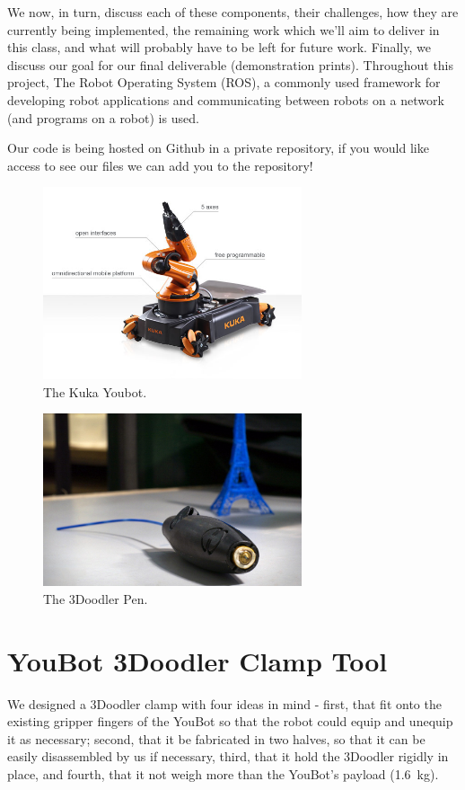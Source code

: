 \documentclass[conference]{acmsiggraph}
\begin{document}
We now, in turn, discuss each of these components, their challenges, how they are currently being implemented, the remaining work which we'll aim to deliver in this class, and what will probably have to be left for future work.  Finally, we discuss our goal for our final deliverable (demonstration prints).  Throughout this project, The Robot Operating System (ROS), a commonly used framework for developing robot applications and communicating between robots on a network (and programs on a robot) is used.

Our code is being hosted on Github in a private repository, if you would like access to see our files we can add you to the repository!

\begin{figure}[ht]
  \centering
  \includegraphics[width=3.0in]{images/youbot.jpg}
  \caption{The Kuka Youbot.}
  \label{fig:youbot}
\end{figure}

\begin{figure}[ht]
  \centering
  \includegraphics[width=3.0in]{images/3doodler.jpg}
  \caption{The 3Doodler Pen.}
  \label{fig:3doodler}
\end{figure}



\section{YouBot 3Doodler Clamp Tool}
We designed a 3Doodler clamp with four ideas in mind - first, that fit onto the existing gripper fingers of the YouBot so that the robot could equip and unequip it as necessary; second, that it be fabricated in two halves, so that it can be easily disassembled by us if necessary, third, that it hold the 3Doodler rigidly in place, and fourth, that it not weigh more than the YouBot's payload (1.6~kg).
\end{document}
